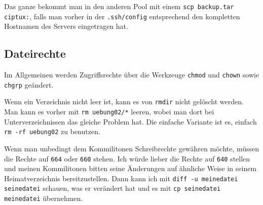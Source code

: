 Das ganze bekommt man in den anderen Pool mit einem \verb#scp backup.tar ciptux:#, falls man vorher in der \texttt{.ssh/config} entsprechend den kompletten Hostnamen des Servers eingetragen hat.

\subsection{Dateirechte}

Im Allgemeinen werden Zugriffsrechte über die Werkzeuge \texttt{chmod} und \texttt{chown} sowie \texttt{chgrp} geändert.

Wenn ein Verzeichnis nicht leer ist, kann es von \texttt{rmdir} nicht gelöscht werden. Man kann es vorher mit \texttt{rm uebung02/*} leeren, wobei man dort bei Unterverzeichnissen das gleiche Problem hat. Die einfache Variante ist es, einfach \texttt{rm -rf uebung02} zu benutzen.

Wenn man unbedingt dem Kommilitonen Schreibrechte gewähren möchte, müssen die Rechte auf \texttt{664} oder \texttt{660} stehen. Ich würde lieber die Rechte auf \texttt{640} stellen und meinen Kommilitonen bitten seine Änderungen auf ähnliche Weise in seinem Heimatverzeichnis bereitzustellen. Dann kann ich mit \texttt{diff -u meinedatei seinedatei} schauen, was er verändert hat und es mit \texttt{cp seinedatei meinedatei} übernehmen.
